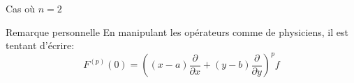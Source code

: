 \documentclass[a4paper]{article}
\begin{document}
\begin{parag}{Cas où $n = 2$}
    \begin{subparag}{Remarque personnelle}
        En manipulant les opérateurs comme de physiciens, il est tentant d'écrire: 
        \[F^{\left(p\right)}\left(0\right) = \left(\left(x - a\right)\frac{\partial}{\partial x} + \left(y - b\right) \frac{\partial}{\partial y}\right)^p f\]
    \end{subparag}
\end{parag}
\end{document}
